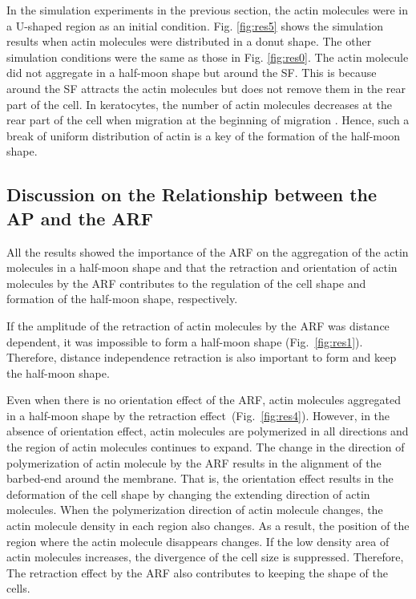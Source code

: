 \documentclass[a4paper,12pt, oneside]{book}
\begin{document}
In the simulation experiments in the previous section, the actin molecules were in a U-shaped region as an initial condition.
Fig. \ref{fig:res5} shows the simulation results when actin molecules were distributed in a donut shape.
The other simulation conditions were the same as those in Fig. \ref{fig:res0}.
The actin molecule did not aggregate in a half-moon shape but around the SF.
This is because around the SF attracts the actin molecules but does not remove them in the rear part of the cell.
In keratocytes, the number of actin molecules decreases at the rear part of the cell when migration at the beginning of migration \cite{ridley2003cell}.
Hence, such a break of uniform distribution of actin is a key of the formation of the half-moon shape.  

\subsection{Discussion on the Relationship between the AP and the ARF}
All the results showed the importance of the ARF on the aggregation of the actin molecules in a half-moon shape and that the retraction and orientation of actin molecules by the ARF contributes to the regulation of the cell shape and formation of the half-moon shape, respectively.

If the amplitude of the retraction of actin molecules by the ARF was distance dependent, it was impossible to form a half-moon shape (Fig.~\ref{fig:res1}).
Therefore, distance independence retraction is also important to form and keep the half-moon shape. 

Even when there is no orientation effect of the ARF, actin molecules aggregated in a half-moon shape by the retraction effect~(Fig.~\ref{fig:res4}).
However, in the absence of orientation effect, actin molecules are polymerized in all directions and the region of actin molecules continues to expand.
The change in the direction of polymerization of actin molecule by the ARF results in the alignment of the barbed-end around the membrane.
That is, the orientation effect results in the deformation of  the cell shape by changing the extending direction of actin molecules.
When the polymerization direction of actin molecule changes, the actin molecule density in each region also changes.
As a result, the position of the region where the actin molecule disappears changes.
If  the low density area of actin molecules increases, the divergence of the cell size is suppressed.
Therefore, The retraction effect by the ARF also contributes to keeping the shape of the cells.
\end{document}
